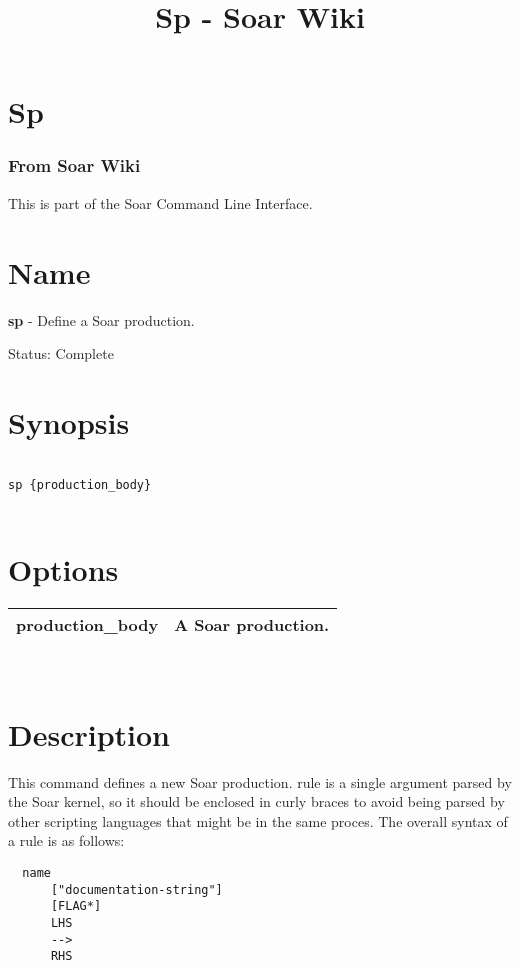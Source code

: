 \documentclass[10pt]{article}
\title{Sp - Soar Wiki}
\begin{document}
\section*{Sp}
\subsubsection*{From Soar Wiki}


 This is part of the Soar Command Line Interface. 
\section*{ Name }


 \textbf{sp}
 - Define a Soar production. 


 Status: Complete
\section*{ Synopsis }
\begin{verbatim}

sp {production_body}


\end{verbatim}
\section*{ Options }


\begin{tabular}{|p{1in}|p{5in}|}
\hline 
 production\_body  & A Soar production.  \\
 \hline 

\end{tabular}



 \\ 

\section*{ Description }


 This command defines a new Soar production. rule is a single argument parsed by the Soar kernel, so it should be enclosed in curly braces to avoid being parsed by other scripting languages that might be in the same proces. The overall syntax of a rule is as follows: \begin{verbatim}
  name 
      ["documentation-string"] 
      [FLAG*]
      LHS
      -->
      RHS

\end{verbatim}
\end{document}
